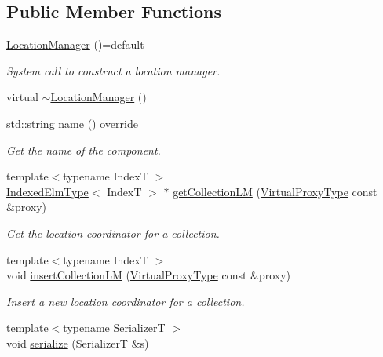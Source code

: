 \subsection*{Public Member Functions}
\begin{DoxyCompactItemize}
\item 
\hyperlink{structvt_1_1location_1_1_location_manager_af5cf57c9ef31ccf5b207394cbd9363ee}{Location\+Manager} ()=default
\begin{DoxyCompactList}\small\item\em System call to construct a location manager. \end{DoxyCompactList}\item 
virtual \hyperlink{structvt_1_1location_1_1_location_manager_abdcd3feb1f6e7c22f88582ad87799de1}{$\sim$\+Location\+Manager} ()
\item 
std\+::string \hyperlink{structvt_1_1location_1_1_location_manager_afdb88906b8c4b5535f239d6581f840e0}{name} () override
\begin{DoxyCompactList}\small\item\em Get the name of the component. \end{DoxyCompactList}\item 
{\footnotesize template$<$typename IndexT $>$ }\\\hyperlink{structvt_1_1location_1_1_location_manager_a9241475655a978ac717ffe5791ad7d15}{Indexed\+Elm\+Type}$<$ IndexT $>$ $\ast$ \hyperlink{structvt_1_1location_1_1_location_manager_a63d16a4f6955fae01b62ed6993e21015}{get\+Collection\+LM} (\hyperlink{namespacevt_a1b417dd5d684f045bb58a0ede70045ac}{Virtual\+Proxy\+Type} const \&proxy)
\begin{DoxyCompactList}\small\item\em Get the location coordinator for a collection. \end{DoxyCompactList}\item 
{\footnotesize template$<$typename IndexT $>$ }\\void \hyperlink{structvt_1_1location_1_1_location_manager_a07688f13ca31cb8d3081b70481a228b1}{insert\+Collection\+LM} (\hyperlink{namespacevt_a1b417dd5d684f045bb58a0ede70045ac}{Virtual\+Proxy\+Type} const \&proxy)
\begin{DoxyCompactList}\small\item\em Insert a new location coordinator for a collection. \end{DoxyCompactList}\item 
{\footnotesize template$<$typename SerializerT $>$ }\\void \hyperlink{structvt_1_1location_1_1_location_manager_a3f0b20c13abb9fcaf610fb3c62b324d5}{serialize} (SerializerT \&s)
\end{DoxyCompactItemize}
